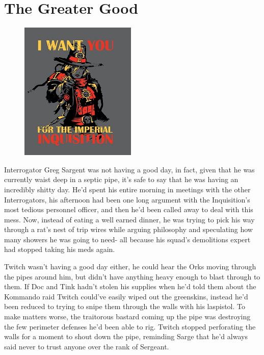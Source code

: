 \chapter{The Greater Good}

\begin{figure}
	\begin{center}
		\includegraphics[width=\figwidth]{pics/10/1.png}
	\end{center}
\end{figure}
Interrogator Greg Sargent was not having a good day, in fact, given that he was currently waist deep in a septic pipe, it's safe to say that he was having an incredibly shitty day. 
He'd spent his entire morning in meetings with the other Interrogators, his afternoon had been one long argument with the Inquisition's most tedious personnel officer, and then he'd been called away to deal with this mess. 
Now, instead of eating a well earned dinner, he was trying to pick his way through a rat's nest of trip wires while arguing philosophy and speculating how many showers he was going to need- all because his squad's demolitions expert had stopped taking his meds again.

Twitch wasn't having a good day either, he could hear the Orks moving through the pipes around him, but didn't have anything heavy enough to blast through to them. 
If Doc and Tink hadn't stolen his supplies when he'd told them about the Kommando raid Twitch could've easily wiped out the greenskins, instead he'd been reduced to trying to snipe them through the walls with his laspistol. 
To make matters worse, the traitorous bastard coming up the pipe was destroying the few perimeter defenses he'd been able to rig. 
Twitch stopped perforating the walls for a moment to shout down the pipe, reminding Sarge that he'd always said never to trust anyone over the rank of Sergeant.

